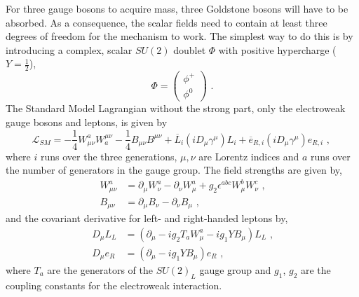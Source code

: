 For three gauge bosons to acquire mass, three Goldstone bosons will have to be absorbed. As a
consequence, the scalar fields need to contain at least three degrees of freedom for the mechanism
to work. The simplest way to do this is by introducing a complex, scalar $SU(2)$ doublet $\Phi$ with
positive hypercharge ($Y = \frac{1}{2}$),
\begin{equation}
  \Phi = \begin{pmatrix} \phi^+ \\ \phi^0 \end{pmatrix} \textrm{ .} 
\end{equation}
The Standard Model Lagrangian without the strong part, \ie only the electroweak gauge bosons and
leptons, is given by
\begin{equation}
  \mathcal{L}_{SM} = - \frac{1}{4}W_{\mu\nu}^aW_a^{\mu\nu} - \frac{1}{4}B_{\mu\nu}B^{\mu\nu} +
\overline{L}_i (iD_\mu\gamma^\mu) L_i + \overline{e}_{R,i} (iD_\mu\gamma^\mu) e_{R,i} \textrm{ , } 
\end{equation}
where $i$ runs over the three generations, $\mu,\nu$ are Lorentz indices and $a$ runs over the
number of generators in the gauge group.
The field strengths are given by,
\begin{align*}
  W_{\mu\nu}^a &= \partial_\mu W_\nu^a - \partial_\nu W_\mu^a + g_2 \epsilon^{abc} W_\mu^b W_\nu^c
\textrm{ ,} \\
  B_{\mu\nu} &= \partial_\mu B_\nu - \partial_\nu B_\mu \textrm{ ,}
\end{align*}
and the covariant derivative for left- and right-handed leptons by,
\begin{align*}
  D_\mu L_L &= \left(\partial_\mu - i g_2 T_a W_\mu^a - i g_1 Y B_\mu \right) L_L \textrm{ ,}\\
  D_\mu e_R &= \left(\partial_\mu - i g_1 Y B_\mu \right) e_R \textrm{ ,}
\end{align*}
where $T_a$ are the generators of the $SU(2)_L$ gauge group and $g_1$, $g_2$ are the coupling
constants for the electroweak interaction.


